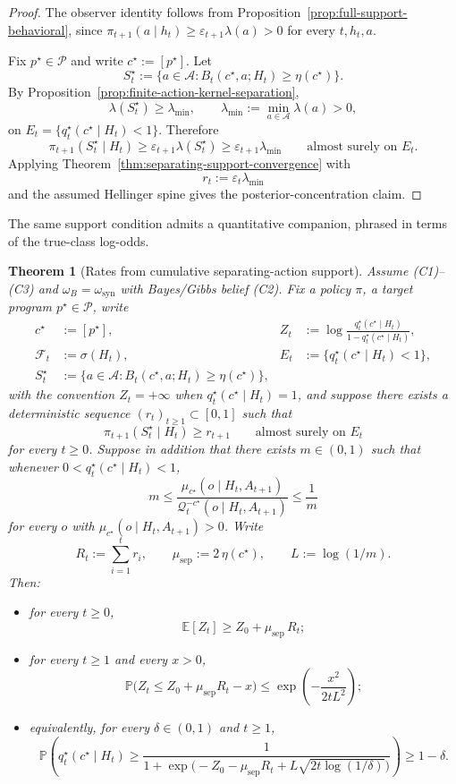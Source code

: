 \documentclass[11pt]{article}
\newtheorem{theorem}{Theorem}[section]
\theoremstyle{definition}
\theoremstyle{remark}
\newcommand{\Acal}{\mathcal{A}}
\newcommand{\Pcal}{\mathcal{P}}
\newcommand{\Qcal}{\mathcal{Q}}
\newcommand{\E}{\mathbb{E}}
\newcommand{\Prob}{\mathbb{P}}
\begin{document}
\begin{proof}
The observer identity follows from Proposition~\ref{prop:full-support-behavioral}, since $\pi_{t+1}(a\mid h_t)\ge \varepsilon_{t+1}\lambda(a)>0$ for every $t,h_t,a$.

Fix $p^\star\in\Pcal$ and write $c^\star:=[p^\star]$. Let
\[
S_t^\star:=\{a\in\Acal:B_t(c^\star,a;H_t)\ge \eta(c^\star)\}.
\]
By Proposition~\ref{prop:finite-action-kernel-separation},
\[
\lambda(S_t^\star)\ge \lambda_{\min},
\qquad
\lambda_{\min}:=\min_{a\in\Acal}\lambda(a)>0,
\]
on $E_t=\{q_t^\star(c^\star\mid H_t)<1\}$. Therefore
\[
\pi_{t+1}(S_t^\star\mid H_t)\ge \varepsilon_{t+1}\lambda(S_t^\star)\ge \varepsilon_{t+1}\lambda_{\min}
\qquad\text{almost surely on }E_t.
\]
Applying Theorem~\ref{thm:separating-support-convergence} with
\[
r_t:=\varepsilon_t\lambda_{\min}
\]
and the assumed Hellinger spine gives the posterior-concentration claim.
\end{proof}

The same support condition admits a quantitative companion, phrased in terms of the true-class log-odds.

\begin{theorem}[Rates from cumulative separating-action support]
\label{thm:separating-support-rate}
Assume \textup{(C1)--(C3)} and $\omega_B=\omega_{\mathrm{syn}}$ with Bayes/Gibbs belief \textup{(C2)}. Fix a policy $\pi$, a target program $p^\star\in\Pcal$, write
\[
\begin{aligned}
c^\star&:=[p^\star],
&
Z_t&:=\log\frac{q_t^\star(c^\star\mid H_t)}{1-q_t^\star(c^\star\mid H_t)},
\\
\mathcal F_t&:=\sigma(H_t),
&
E_t&:=\{q_t^\star(c^\star\mid H_t)<1\},
\\
S_t^\star&:=\{a\in\Acal:B_t(c^\star,a;H_t)\ge \eta(c^\star)\},
\end{aligned}
\]
with the convention $Z_t=+\infty$ when $q_t^\star(c^\star\mid H_t)=1$, and suppose there exists a deterministic sequence $(r_t)_{t\ge 1}\subset[0,1]$ such that
\[
\pi_{t+1}(S_t^\star\mid H_t)\ge r_{t+1}
\qquad\text{almost surely on }E_t
\]
for every $t\ge 0$. Suppose in addition that there exists $m\in(0,1)$ such that whenever $0<q_t^\star(c^\star\mid H_t)<1$,
\[
m\le
\frac{\mu_{c^\star}(o\mid H_t,A_{t+1})}{\Qcal_t^{-c^\star}(o\mid H_t,A_{t+1})}
\le \frac{1}{m}
\]
for every $o$ with $\mu_{c^\star}(o\mid H_t,A_{t+1})>0$. Write
\[
R_t:=\sum_{i=1}^t r_i,
\qquad
\mu_{\mathrm{sep}}:=2\,\eta(c^\star),
\qquad
L:=\log(1/m).
\]
Then:
\begin{itemize}
\item[(i)] for every $t\ge 0$,
\[
\E[Z_t]\ge Z_0+\mu_{\mathrm{sep}}\,R_t;
\]
\item[(ii)] for every $t\ge 1$ and every $x>0$,
\[
\Prob\!\bigl(Z_t\le Z_0+\mu_{\mathrm{sep}}R_t-x\bigr)
\le
\exp\!\left(-\frac{x^2}{2tL^2}\right);
\]
\item[(iii)] equivalently, for every $\delta\in(0,1)$ and $t\ge 1$,
\[
\Prob\!\left(
q_t^\star(c^\star\mid H_t)\ge
\frac{1}{1+\exp\!\bigl(-Z_0-\mu_{\mathrm{sep}}R_t+L\sqrt{2t\log(1/\delta)}\bigr)}
\right)\ge 1-\delta.
\]
\end{itemize}
\end{theorem}
\end{document}
